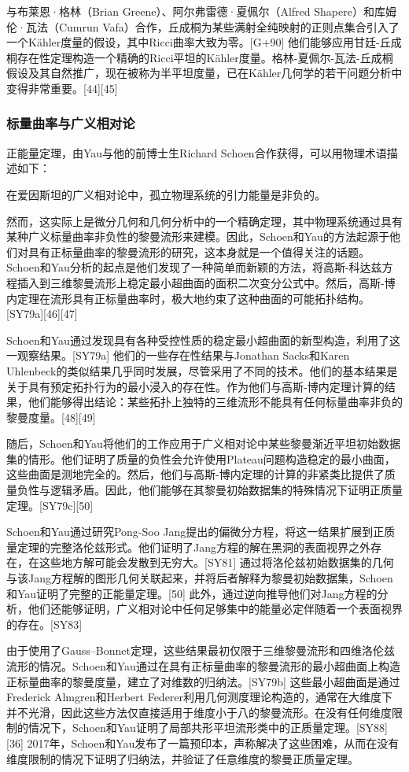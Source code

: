 与布莱恩·格林（Brian Greene）、阿尔弗雷德·夏佩尔（Alfred Shapere）和库姆伦·瓦法（Cumrun Vafa）合作，丘成桐为某些满射全纯映射的正则点集合引入了一个Kähler度量的假设，其中Ricci曲率大致为零。[G+90] 他们能够应用甘廷-丘成桐存在性定理构造一个精确的Ricci平坦的Kähler度量。格林-夏佩尔-瓦法-丘成桐假设及其自然推广，现在被称为半平坦度量，已在Kähler几何学的若干问题分析中变得非常重要。[44][45]
\subsubsection{标量曲率与广义相对论}
正能量定理，由Yau与他的前博士生Richard Schoen合作获得，可以用物理术语描述如下：

在爱因斯坦的广义相对论中，孤立物理系统的引力能量是非负的。

然而，这实际上是微分几何和几何分析中的一个精确定理，其中物理系统通过具有某种广义标量曲率非负性的黎曼流形来建模。因此，Schoen和Yau的方法起源于他们对具有正标量曲率的黎曼流形的研究，这本身就是一个值得关注的话题。Schoen和Yau分析的起点是他们发现了一种简单而新颖的方法，将高斯-科达兹方程插入到三维黎曼流形上稳定最小超曲面的面积二次变分公式中。然后，高斯-博内定理在流形具有正标量曲率时，极大地约束了这种曲面的可能拓扑结构。[SY79a][46][47]

Schoen和Yau通过发现具有各种受控性质的稳定最小超曲面的新型构造，利用了这一观察结果。[SY79a] 他们的一些存在性结果与Jonathan Sacks和Karen Uhlenbeck的类似结果几乎同时发展，尽管采用了不同的技术。他们的基本结果是关于具有预定拓扑行为的最小浸入的存在性。作为他们与高斯-博内定理计算的结果，他们能够得出结论：某些拓扑上独特的三维流形不能具有任何标量曲率非负的黎曼度量。[48][49]

随后，Schoen和Yau将他们的工作应用于广义相对论中某些黎曼渐近平坦初始数据集的情形。他们证明了质量的负性会允许使用Plateau问题构造稳定的最小曲面，这些曲面是测地完全的。然后，他们与高斯-博内定理的计算的非紧类比提供了质量负性与逻辑矛盾。因此，他们能够在其黎曼初始数据集的特殊情况下证明正质量定理。[SY79c][50]

Schoen和Yau通过研究Pong-Soo Jang提出的偏微分方程，将这一结果扩展到正质量定理的完整洛伦兹形式。他们证明了Jang方程的解在黑洞的表面视界之外存在，在这些地方解可能会发散到无穷大。[SY81] 通过将洛伦兹初始数据集的几何与该Jang方程解的图形几何关联起来，并将后者解释为黎曼初始数据集，Schoen和Yau证明了完整的正能量定理。[50] 此外，通过逆向推导他们对Jang方程的分析，他们还能够证明，广义相对论中任何足够集中的能量必定伴随着一个表面视界的存在。[SY83]

由于使用了Gauss–Bonnet定理，这些结果最初仅限于三维黎曼流形和四维洛伦兹流形的情况。Schoen和Yau通过在具有正标量曲率的黎曼流形的最小超曲面上构造正标量曲率的黎曼度量，建立了对维数的归纳法。[SY79b] 这些最小超曲面是通过Frederick Almgren和Herbert Federer利用几何测度理论构造的，通常在大维度下并不光滑，因此这些方法仅直接适用于维度小于八的黎曼流形。在没有任何维度限制的情况下，Schoen和Yau证明了局部共形平坦流形类中的正质量定理。[SY88][36] 2017年，Schoen和Yau发布了一篇预印本，声称解决了这些困难，从而在没有维度限制的情况下证明了归纳法，并验证了任意维度的黎曼正质量定理。


